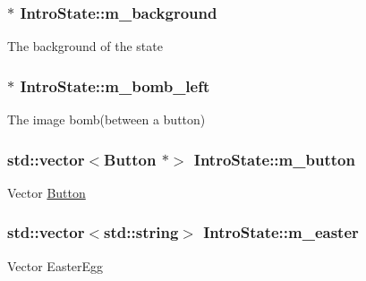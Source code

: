 \subsubsection[{m\+\_\+background}]{$\ast$ Intro\+State\+::m\+\_\+background\hspace{0.3cm}{\ttfamily [private]}}\label{class_intro_state_ad64626c0d7654481449fec2f1d07c7ed}
The background of the state \hypertarget{class_intro_state_abf443c0163efe764d7f8961e2816b73d}{}
\subsubsection[{m\+\_\+bomb\+\_\+left}]{$\ast$ Intro\+State\+::m\+\_\+bomb\+\_\+left\hspace{0.3cm}{\ttfamily [private]}}\label{class_intro_state_abf443c0163efe764d7f8961e2816b73d}
The image bomb(between a button) \hypertarget{class_intro_state_a0b10257f3ddc662e0476bfd30def50e4}{}
\subsubsection[{m\+\_\+button}]{\setlength{\rightskip}{0pt plus 5cm}std\+::vector$<${\bf Button} $\ast$$>$ Intro\+State\+::m\+\_\+button\hspace{0.3cm}{\ttfamily [private]}}\label{class_intro_state_a0b10257f3ddc662e0476bfd30def50e4}
Vector \hyperlink{class_button}{Button} \hypertarget{class_intro_state_a9b6a7c6121418d2659ec79f600385b8f}{}
\subsubsection[{m\+\_\+easter}]{\setlength{\rightskip}{0pt plus 5cm}std\+::vector$<$std\+::string$>$ Intro\+State\+::m\+\_\+easter\hspace{0.3cm}{\ttfamily [private]}}\label{class_intro_state_a9b6a7c6121418d2659ec79f600385b8f}
Vector Easter\+Egg \hypertarget{class_intro_state_a9a4157cf8aa4a5ce48b782b7f4a33af9}{}
